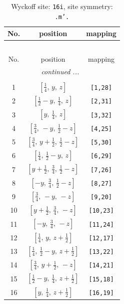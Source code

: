 \documentclass[fleqn,8pt]{jsarticle}
\begin{document}
\renewcommand{\arraystretch}{1.2}
\begin{longtable}{ccc}
\caption{Wyckoff site: {\tt 16i}, site symmetry: {\tt .m'.}}
 \\
 \hline \hline
No. & position & mapping \\ \hline \endfirsthead

\multicolumn{2}{l}{\tablename\ \thetable{}} \\
 \hline \hline
No. & position & mapping \\ \hline \endhead

 \hline \hline
\multicolumn{2}{r}{\footnotesize\it continued ...} \\ \endfoot

 \hline \hline
\multicolumn{2}{r}{} \\ \endlastfoot

1 & $\left[ \frac{1}{4},\, y,\, z \right]$ & {\tt [1,28]} \\ \hline
2 & $\left[ \frac{1}{2} - y,\, \frac{1}{4},\, z \right]$ & {\tt [2,31]} \\ \hline
3 & $\left[ y,\, \frac{1}{4},\, z \right]$ & {\tt [3,32]} \\ \hline
4 & $\left[ \frac{3}{4},\, - y,\, \frac{1}{2} - z \right]$ & {\tt [4,25]} \\ \hline
5 & $\left[ \frac{3}{4},\, y + \frac{1}{2},\, \frac{1}{2} - z \right]$ & {\tt [5,30]} \\ \hline
6 & $\left[ \frac{1}{4},\, \frac{1}{2} - y,\, z \right]$ & {\tt [6,29]} \\ \hline
7 & $\left[ y + \frac{1}{2},\, \frac{3}{4},\, \frac{1}{2} - z \right]$ & {\tt [7,26]} \\ \hline
8 & $\left[ - y,\, \frac{3}{4},\, \frac{1}{2} - z \right]$ & {\tt [8,27]} \\ \hline
9 & $\left[ \frac{3}{4},\, - y,\, - z \right]$ & {\tt [9,20]} \\ \hline
10 & $\left[ y + \frac{1}{2},\, \frac{3}{4},\, - z \right]$ & {\tt [10,23]} \\ \hline
11 & $\left[ - y,\, \frac{3}{4},\, - z \right]$ & {\tt [11,24]} \\ \hline
12 & $\left[ \frac{1}{4},\, y,\, z + \frac{1}{2} \right]$ & {\tt [12,17]} \\ \hline
13 & $\left[ \frac{1}{4},\, \frac{1}{2} - y,\, z + \frac{1}{2} \right]$ & {\tt [13,22]} \\ \hline
14 & $\left[ \frac{3}{4},\, y + \frac{1}{2},\, - z \right]$ & {\tt [14,21]} \\ \hline
15 & $\left[ \frac{1}{2} - y,\, \frac{1}{4},\, z + \frac{1}{2} \right]$ & {\tt [15,18]} \\ \hline
16 & $\left[ y,\, \frac{1}{4},\, z + \frac{1}{2} \right]$ & {\tt [16,19]} \\
\end{longtable}
\end{document}
